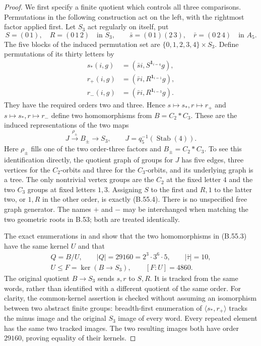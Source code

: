 \begin{proof}
We first specify a finite quotient which controls all three
comparisons. Permutations in the following construction act
on the left, with the rightmost factor applied first.
Let $S_3$ act regularly on itself, put
\[
 S=(0\,1),\quad R=(0\,1\,2)\quad\text{in }S_3,
 \qquad
 \bar s=(0\,1)(2\,3),\quad\bar r=(0\,2\,4)
                                      \quad\text{in }A_5.
\]
The five blocks of the induced permutation set are
$\{0,1,2,3,4\}\times S_3$. Define permutations of its thirty
letters by
\[
 \begin{split}
 s_*(i,g)&=(\bar s i,S^{\mathbf1_{i=4}}g),\\
 r_+(i,g)&=(\bar r i,R^{\mathbf1_{i=1}}g),\\
 r_-(i,g)&=(\bar r i,R^{\mathbf1_{i=3}}g).
 \end{split}                                               \tag{B.55.3}
\]
They have the required orders two and three. Hence
$s\mapsto s_*,r\mapsto r_+$ and
$s\mapsto s_*,r\mapsto r_-$ define two homomorphisms from
$B=C_2*C_3$. These are the induced representations of the
two maps
\[
       J\xrightarrow{\rho_\pm}B_\pm
                       \longrightarrow S_3,
       \qquad J=q_5^{-1}(\operatorname{Stab}(4)).
                                                               \tag{B.55.4}
\]
Here $\rho_\pm$ fills one of the two order-three factors
and $B_\pm=C_2*C_3$. To see this identification directly,
the quotient graph of groups for $J$ has five edges,
three vertices for the $C_2$-orbits and three for the
$C_3$-orbits, and its underlying graph is a tree.
The only nontrivial vertex groups are the $C_2$ at the
fixed letter $4$ and the two $C_3$ groups at fixed letters
$1,3$. Assigning $S$ to the first and $R,1$ to the latter
two, or $1,R$ in the other order, is exactly (B.55.4).
There is no unspecified free graph generator.
The names $+$ and $-$ may be interchanged when matching
the two geometric roots in B.53; both are treated identically.

The exact enumerations in
 and
 show that the two
homomorphisms in (B.55.3) have the same kernel $U$ and that
\[
 \begin{gathered}
 Q=B/U,\qquad |Q|=29160=2^3\cdot3^6\cdot5,\qquad
 |\bar\tau|=10,\\
 U\leq F=\ker(B\longrightarrow S_3),\qquad [F:U]=4860.
 \end{gathered}                                             \tag{B.55.5}
\]
The original quotient $B\to S_3$ sends $s,r$ to $S,R$.
It is tracked from the same words, rather than identified
with a different quotient of the same order.
For clarity, the common-kernel assertion is checked without
assuming an isomorphism between two abstract finite groups:
breadth-first enumeration of $\langle s_*,r_+\rangle$
tracks the minus image and the original $S_3$ image of every
word. Every repeated element has the same two tracked images.
The two resulting images both have order $29160$, proving
equality of their kernels.


\end{proof}
